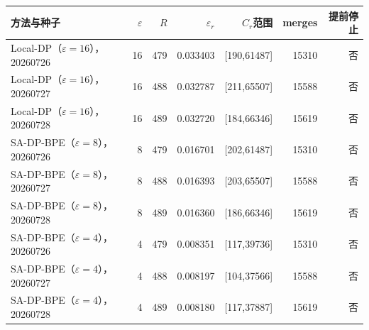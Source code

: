 \begin{tabular}{lrrrrrr}
\toprule
方法与种子 & $\varepsilon$ & $R$ & $\varepsilon_r$ & $C_r$范围 & merges & 提前停止 \\
\midrule
Local-DP（$\varepsilon=16$），20260726 & 16 & 479 & 0.033403 & [190,61487] & 15310 & 否 \\
Local-DP（$\varepsilon=16$），20260727 & 16 & 488 & 0.032787 & [211,65507] & 15588 & 否 \\
Local-DP（$\varepsilon=16$），20260728 & 16 & 489 & 0.032720 & [184,66346] & 15619 & 否 \\
SA-DP-BPE（$\varepsilon=8$），20260726 & 8 & 479 & 0.016701 & [202,61487] & 15310 & 否 \\
SA-DP-BPE（$\varepsilon=8$），20260727 & 8 & 488 & 0.016393 & [203,65507] & 15588 & 否 \\
SA-DP-BPE（$\varepsilon=8$），20260728 & 8 & 489 & 0.016360 & [186,66346] & 15619 & 否 \\
SA-DP-BPE（$\varepsilon=4$），20260726 & 4 & 479 & 0.008351 & [117,39736] & 15310 & 否 \\
SA-DP-BPE（$\varepsilon=4$），20260727 & 4 & 488 & 0.008197 & [104,37566] & 15588 & 否 \\
SA-DP-BPE（$\varepsilon=4$），20260728 & 4 & 489 & 0.008180 & [117,37887] & 15619 & 否 \\
\bottomrule
\end{tabular}
